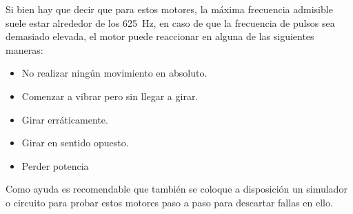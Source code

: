 \documentclass[../main]{subfiles}
\begin{document}

Si bien hay que decir que para estos motores, la máxima frecuencia admisible suele estar alrededor de los \qty{625}{Hz}, en caso de que la frecuencia de pulsos sea demasiado elevada, el motor puede reaccionar en alguna de las siguientes maneras:
\begin{itemize}
  \item No realizar ningún movimiento en absoluto.
  \item Comenzar a vibrar pero sin llegar a girar.
  \item Girar erráticamente.
  \item Girar en sentido opuesto.
  \item Perder potencia
\end{itemize}

Como ayuda es recomendable que también se coloque a disposición un simulador o circuito para probar estos motores paso a paso para descartar fallas en ello.
\end{document}
